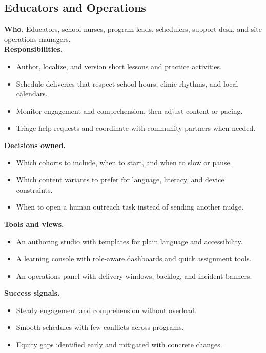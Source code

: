 \documentclass[12pt]{article}
\begin{document}
\subsection*{Educators and Operations}
\textbf{Who.} Educators, school nurses, program leads, schedulers, support desk, and site operations managers.\\
\textbf{Responsibilities.}
\begin{itemize}[leftmargin=*]
  \item Author, localize, and version short lessons and practice activities.
  \item Schedule deliveries that respect school hours, clinic rhythms, and local calendars.
  \item Monitor engagement and comprehension, then adjust content or pacing.
  \item Triage help requests and coordinate with community partners when needed.
\end{itemize}
\textbf{Decisions owned.}
\begin{itemize}[leftmargin=*]
  \item Which cohorts to include, when to start, and when to slow or pause.
  \item Which content variants to prefer for language, literacy, and device constraints.
  \item When to open a human outreach task instead of sending another nudge.
\end{itemize}
\textbf{Tools and views.}
\begin{itemize}[leftmargin=*]
  \item An authoring studio with templates for plain language and accessibility.
  \item A learning console with role-aware dashboards and quick assignment tools.
  \item An operations panel with delivery windows, backlog, and incident banners.
\end{itemize}
\textbf{Success signals.}
\begin{itemize}[leftmargin=*]
  \item Steady engagement and comprehension without overload.
  \item Smooth schedules with few conflicts across programs.
  \item Equity gaps identified early and mitigated with concrete changes.
\end{itemize}
\end{document}
